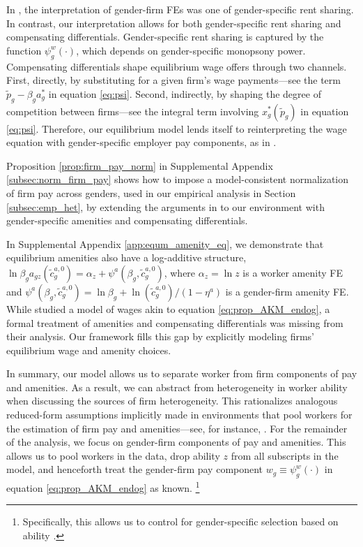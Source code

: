 In \citet{CardCardosoKline2016}, the interpretation of gender-firm FEs was one of gender-specific rent sharing. In contrast, our interpretation allows for both gender-specific rent sharing and compensating differentials. Gender-specific rent sharing is captured by the function $\psi_{g}^{w}(\cdot)$, which depends on gender-specific monopsony power. Compensating differentials shape equilibrium wage offers through two channels. First, directly, by substituting for a given firm's wage payments---see the term $\tilde{p}_{g} - \beta_{g} a_{g}^{*}$ in equation \eqref{eq:psi}. Second, indirectly, by shaping the degree of competition between firms---see the integral term involving $x_{g}^{*}(\tilde{p}_{g})$ in equation \eqref{eq:psi}. Therefore, our equilibrium model lends itself to reinterpreting the wage equation with gender-specific employer pay components, as in \citet{CardCardosoKline2016}.

Proposition \ref{prop:firm_pay_norm} in Supplemental Appendix \ref{subsec:norm_firm_pay} shows how to impose a model-consistent normalization of firm pay across genders, used in our empirical analysis in Section \ref{subsec:emp_het}, by extending the arguments in \citet{CardCardosoKline2016} to our environment with gender-specific amenities and compensating differentials.%

In Supplemental Appendix \ref{app:equm_amenity_eq}, we demonstrate that equilibrium amenities also have a log-additive structure, $\ln \beta_{g} a_{gz}(\tilde{c}_{g}^{a,0}) = \alpha_{z} + \psi^{a}(\beta_{g}, \tilde{c}_{g}^{a,0})$, where $\alpha_{z} = \ln z$ is a worker amenity FE and $\psi^{a}(\beta_{g}, \tilde{c}_{g}^{a,0}) = \ln \beta_{g} + \ln (\tilde{c}_{g}^{a,0})/(1 - \eta^{a})$ is a gender-firm amenity FE. While \citet{CardCardosoKline2016} studied a model of wages akin to equation \eqref{eq:prop_AKM_endog}, a formal treatment of amenities and compensating differentials was missing from their analysis. Our framework fills this gap by explicitly modeling firms' equilibrium wage and amenity choices.

In summary, our model allows us to separate worker from firm components of pay and amenities. As a result, we can abstract from heterogeneity in worker ability when discussing the sources of firm heterogeneity. This rationalizes analogous reduced-form assumptions implicitly made in environments that pool workers for the estimation of firm pay and amenities---see, for instance, \cite{Sorkin2017, Sorkin2018}. For the remainder of the analysis, we focus on gender-firm components of pay and amenities. This allows us to pool workers in the data, drop ability $z$ from all subscripts in the model, and henceforth treat the gender-firm pay component $w_{g} \equiv \psi_{g}^{w}(\cdot)$ in equation \eqref{eq:prop_AKM_endog} as known.%
%
\footnote{Specifically, this allows us to control for gender-specific selection based on ability \citep{MulliganRubinstein2008}.} %
%


